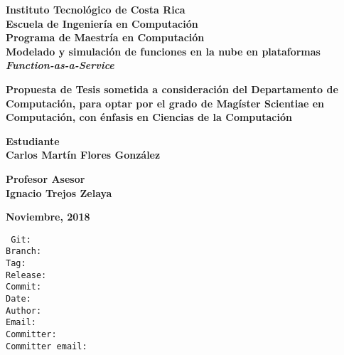\documentclass[12pt, twoside]{report}
\begin{document}
\thispagestyle{plain}
\begin{titlepage}
	\begin{center}
        {\fontsize{24}{28}\selectfont \textbf{Instituto Tecnológico de Costa Rica}\\}
        \vspace{1cm}
        {\fontsize{20}{24}\selectfont \textbf{Escuela de Ingeniería en Computación}\\}
        {\fontsize{18}{22}\selectfont \textbf{Programa de Maestría en Computación}\\}
        \vspace{2cm}
        {\fontsize{20}{24}\selectfont \textbf{Modelado y simulación de funciones en la nube en plataformas \textit{Function-as-a-Service}}}    
    
    
        \vspace{2cm}
        {\fontsize{14}{17}\selectfont \textbf{Propuesta de Tesis sometida a consideración del Departamento de Computación, para optar por el grado de Magíster Scientiae en Computación, con énfasis en Ciencias de la Computación
}}
        
       \vspace{1.5cm}
       {\fontsize{14}{17}\selectfont \textbf{Estudiante\\ Carlos Martín Flores González}} 
       
       \vspace{1cm}
       {\fontsize{14}{17}\selectfont \textbf{Profesor Asesor\\ Ignacio Trejos Zelaya}}
       
       \vspace{1.5cm}
       {\fontsize{14}{17}\selectfont \textbf{Noviembre, 2018}}                       
        
    \end{center}
\end{titlepage}

{} 
\renewcommand*\contentsname{Índice}
\tableofcontents
\listoffigures

\newpage
{\footnotesize
\noindent
\texttt{
Git: \gitReferences \\
Branch: \gitBranch \\
Tag: \gitVtag \\
Release: \gitReln{} \\
Commit: \gitAbbrevHash \\
Date: \gitAuthorIsoDate \\
Author: \gitAuthorName\\
Email: \gitAuthorEmail\\
Committer: \gitCommitterName\\
Committer email: \gitCommitterEmail
}}
\newpage
\end{document}
